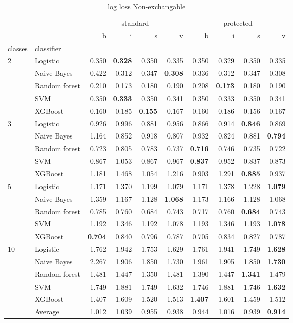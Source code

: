 \begin{table}
\caption{log loss Non-exchangable}
\begin{tabular}{l|l|rrrr|rrrr}
\toprule
 &  & \multicolumn{4}{c}{standard} & \multicolumn{4}{c}{protected} \\
 &  & b & i & s & v & b & i & s & v \\
classes & classifier &  &  &  &  &  &  &  &  \\
\midrule
\midrule
\multirow[c]{5}{*}{2} & Logistic & 0.350 & \textbf{0.328} & 0.350 & 0.335 & 0.350 & 0.329 & 0.350 & 0.335 \\
 & Naive Bayes & 0.422 & 0.312 & 0.347 & \textbf{0.308} & 0.336 & 0.312 & 0.347 & 0.308 \\
 & Random forest & 0.210 & 0.173 & 0.180 & 0.190 & 0.208 & \textbf{0.173} & 0.180 & 0.190 \\
 & SVM & 0.350 & \textbf{0.333} & 0.350 & 0.341 & 0.350 & 0.333 & 0.350 & 0.341 \\
 & XGBoost & 0.160 & 0.185 & \textbf{0.155} & 0.167 & 0.160 & 0.186 & 0.156 & 0.167 \\
\midrule
\multirow[c]{5}{*}{3} & Logistic & 0.926 & 0.996 & 0.881 & 0.956 & 0.866 & 0.914 & \textbf{0.846} & 0.869 \\
 & Naive Bayes & 1.164 & 0.852 & 0.918 & 0.807 & 0.932 & 0.824 & 0.881 & \textbf{0.794} \\
 & Random forest & 0.723 & 0.805 & 0.783 & 0.737 & \textbf{0.716} & 0.746 & 0.735 & 0.722 \\
 & SVM & 0.867 & 1.053 & 0.867 & 0.967 & \textbf{0.837} & 0.952 & 0.837 & 0.873 \\
 & XGBoost & 1.181 & 1.468 & 1.054 & 1.216 & 0.903 & 1.291 & \textbf{0.885} & 0.937 \\
\midrule
\multirow[c]{5}{*}{5} & Logistic & 1.171 & 1.370 & 1.199 & 1.079 & 1.171 & 1.378 & 1.228 & \textbf{1.079} \\
 & Naive Bayes & 1.359 & 1.167 & 1.128 & \textbf{1.068} & 1.173 & 1.166 & 1.128 & 1.068 \\
 & Random forest & 0.785 & 0.760 & 0.684 & 0.743 & 0.717 & 0.760 & \textbf{0.684} & 0.743 \\
 & SVM & 1.192 & 1.346 & 1.192 & 1.078 & 1.193 & 1.346 & 1.193 & \textbf{1.078} \\
 & XGBoost & \textbf{0.704} & 0.840 & 0.796 & 0.787 & 0.705 & 0.834 & 0.827 & 0.787 \\
\midrule
\multirow[c]{5}{*}{10} & Logistic & 1.762 & 1.942 & 1.753 & 1.629 & 1.761 & 1.941 & 1.749 & \textbf{1.628} \\
 & Naive Bayes & 2.267 & 1.906 & 1.850 & 1.730 & 1.961 & 1.905 & 1.850 & \textbf{1.730} \\
 & Random forest & 1.481 & 1.447 & 1.350 & 1.481 & 1.390 & 1.447 & \textbf{1.341} & 1.479 \\
 & SVM & 1.749 & 1.881 & 1.749 & 1.632 & 1.746 & 1.881 & 1.746 & \textbf{1.632} \\
 & XGBoost & 1.407 & 1.609 & 1.520 & 1.513 & \textbf{1.407} & 1.601 & 1.459 & 1.512 \\\midrule\ & Average & 1.012 & 1.039 & 0.955 & 0.938 & 0.944 & 1.016 & 0.939 & \textbf{0.914} \\
\bottomrule
\end{tabular}
\end{table}
